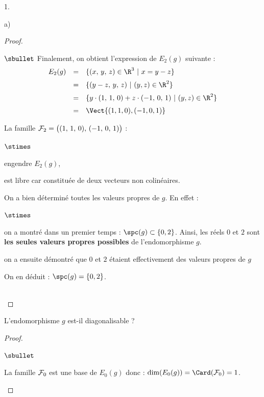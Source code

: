 \begin{noliste}{1.}
\begin{noliste}{a)}
\begin{proof}
\begin{noliste}{$\sbullet$}
	Finalement, on obtient l'expression de $E_2(g)$ suivante :
	\[
	  \begin{array}{rcl}
	    E_2(g) & = &  \{ (x, \, y, \, z) \in \R^3 \ | \ x=y-z \}
	    \\[.2cm]
	    & = &  \{(y-z, \, y, \, z) \ | \ (y,z) \in \R^2\}
	    \\[.2cm]
	    & = &  \{y \cdot (1, \, 1, \, 0) + z \cdot (-1, \, 0, \, 1) \ 
	    | \ (y,z) \in \R^2\}
	    \\[.2cm]
	    & = &  \Vect{(1,1,0),(-1,0,1)}
	  \end{array}
	\]
	
	La famille ${\cal F}_2 = \big( (1, \, 1, \, 0), \, (-1, \, 0,
	\, 1) \big)$ : 
	\begin{noliste}{$\stimes$}
	  \item engendre $E_2(g)$,
	  \item est libre car constituée de deux vecteurs non 
	  colinéaires.
	\end{noliste}
      \end{noliste}
      
      
      \newpage
      
      
      \begin{remark}
        On a bien déterminé toutes les valeurs propres de $g$. En
        effet :
        \begin{noliste}{$\stimes$}
        \item on a montré dans un premier temps : $\spc(g) \subset
          \{0,2\}$. Ainsi, les réels $0$ et $2$ sont {\bf les seules
            valeurs propres possibles} de l'endomorphisme $g$.
	  
	  \item on a ensuite démontré que $0$ et $2$ étaient 
	  effectivement des valeurs propres de $g$
        \end{noliste}
        On en déduit : $\spc(g) = \{0,2\}$.
      \end{remark}~\\[-1.4cm]
    \end{proof}

    
    \item L'endomorphisme $g$ est-il diagonalisable ?
    
    \begin{proof}~
      \begin{noliste}{$\sbullet$}
	\item La famille ${\cal F}_0$ est une base de $E_0(g)$ donc :
	$\dim(E_0(g)) = \Card({\cal F}_0) =1$.
	

\end{noliste}
\end{proof}
\end{noliste}
\end{noliste}

